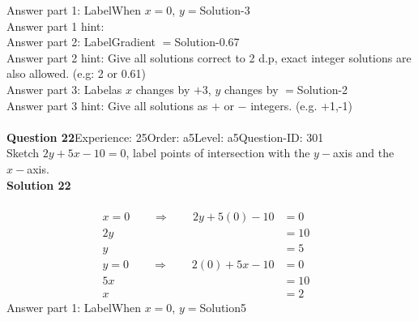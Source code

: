 \documentclass{article}
\begin{document}
Answer part 1: \hspace{10pt}Label\hspace{10pt}When $x=0$, $y=$\hspace{10pt}Solution\hspace{10pt}-3\\
Answer part 1 hint: \hspace{15pt}\\
Answer part 2: \hspace{10pt}Label\hspace{10pt}Gradient $=$\hspace{10pt}Solution\hspace{10pt}-0.67\\
Answer part 2 hint: \hspace{15pt}Give all solutions correct to 2 d.p, exact integer solutions are also allowed. (e.g: 2 or 0.61)\\
Answer part 3: \hspace{10pt}Label\hspace{10pt}as $x$ changes by $+3$, $y$ changes by $=$\hspace{10pt}Solution\hspace{10pt}-2\\
Answer part 3 hint: \hspace{15pt}Give all solutions as $+$ or $-$ integers. (e.g. +1,-1)\\
\\[4pt]
\noindent\textbf{Question 22}\hspace{20pt}Experience: 25\hspace{20pt}Order: a5\hspace{20pt}Level: a5\hspace{20pt}Question-ID: 301\\[2pt]
Sketch $2y+5x-10=0$, label points of intersection with the $y-$axis and the $x-$axis.\\[4pt]
\noindent\textbf{Solution 22}\\[2pt]
\\[-35pt]\begin{align*}
x=0\qquad\Rightarrow\qquad 2y+5(0)-10&=0&\\[2pt]
2y&=10\\[2pt]
y&=5\\[12pt]
y=0\qquad\Rightarrow\qquad 2(0)+5x-10&=0&\\[2pt]
5x&=10\\[2pt]
x&=2
\end{align*}
Answer part 1: \hspace{10pt}Label\hspace{10pt}When $x=0$, $y=$\hspace{10pt}Solution\hspace{10pt}5\\
\end{document}
